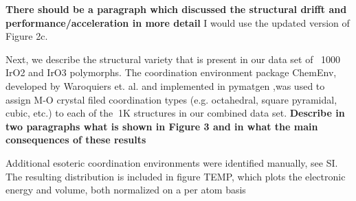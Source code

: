 %


{\bf There should be a paragraph which discussed the structural drifft and performance/acceleration in more detail}
I would use the updated version of Figure 2c.


Next, we describe the structural variety that is present in our data set of ~1000 IrO2 and IrO3 polymorphs.
The coordination environment package ChemEnv, developed by Waroquiers et. al. \cite{Waroquiers2017} and implemented in pymatgen \cite{Ong2013},was used to assign M-O crystal filed coordination types (e.g. octahedral, square pyramidal, cubic, etc.) to each of the $~$1K structures in our combined data set.
{\bf Describe in two paragraphs what is shown in Figure 3 and in what the main consequences of these results}

%
Additional esoteric coordination environments were identified manually, see SI.
The resulting distribution is included in figure TEMP, which plots the electronic energy and volume, both normalized on a per atom basis



